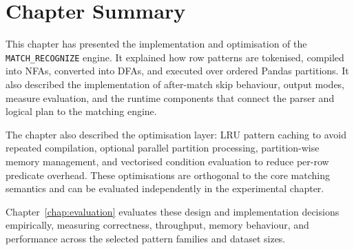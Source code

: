 \section{Chapter Summary}
\label{sec:impl-summary}

This chapter has presented the implementation and optimisation of the
\texttt{MATCH\_RECOGNIZE} engine.  It explained how row patterns are
tokenised, compiled into NFAs, converted into DFAs, and executed over
ordered Pandas partitions.  It also described the implementation of
after-match skip behaviour, output modes, measure evaluation, and the
runtime components that connect the parser and logical plan to the
matching engine.

The chapter also described the optimisation layer: LRU pattern
caching to avoid repeated compilation, optional parallel
partition processing, partition-wise memory management, and
vectorised condition evaluation to reduce per-row predicate
overhead.  These optimisations are orthogonal to the core matching
semantics and can be evaluated independently in the experimental
chapter.

Chapter~\ref{chap:evaluation} evaluates these design and
implementation decisions empirically, measuring correctness,
throughput, memory behaviour, and performance across the selected
pattern families and dataset sizes.
